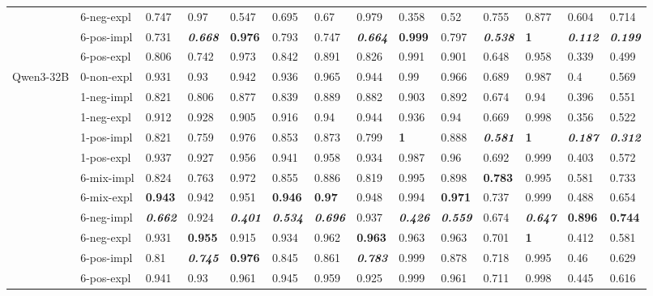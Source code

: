 \begin{tabular}{ll|llll|llll|llll}
 & 6-neg-expl & 0.747 & 0.97 & 0.547 & 0.695 & 0.67 & 0.979 & 0.358 & 0.52 & 0.755 & 0.877 & 0.604 & 0.714 \\
 & 6-pos-impl & 0.731 & \bfseries \itshape 0.668 & \bfseries 0.976 & 0.793 & 0.747 & \bfseries \itshape 0.664 & \bfseries 0.999 & 0.797 & \bfseries \itshape 0.538 & \bfseries 1 & \bfseries \itshape 0.112 & \bfseries \itshape 0.199 \\
 & 6-pos-expl & 0.806 & 0.742 & 0.973 & 0.842 & 0.891 & 0.826 & 0.991 & 0.901 & 0.648 & 0.958 & 0.339 & 0.499 \\
\midrule
\multirow[t]{11}{*}{Qwen3-32B} & 0-non-expl & 0.931 & 0.93 & 0.942 & 0.936 & 0.965 & 0.944 & 0.99 & 0.966 & 0.689 & 0.987 & 0.4 & 0.569 \\
 & 1-neg-impl & 0.821 & 0.806 & 0.877 & 0.839 & 0.889 & 0.882 & 0.903 & 0.892 & 0.674 & 0.94 & 0.396 & 0.551 \\
 & 1-neg-expl & 0.912 & 0.928 & 0.905 & 0.916 & 0.94 & 0.944 & 0.936 & 0.94 & 0.669 & 0.998 & 0.356 & 0.522 \\
 & 1-pos-impl & 0.821 & 0.759 & 0.976 & 0.853 & 0.873 & 0.799 & \bfseries 1 & 0.888 & \bfseries \itshape 0.581 & \bfseries 1 & \bfseries \itshape 0.187 & \bfseries \itshape 0.312 \\
 & 1-pos-expl & 0.937 & 0.927 & 0.956 & 0.941 & 0.958 & 0.934 & 0.987 & 0.96 & 0.692 & 0.999 & 0.403 & 0.572 \\
 & 6-mix-impl & 0.824 & 0.763 & 0.972 & 0.855 & 0.886 & 0.819 & 0.995 & 0.898 & \bfseries 0.783 & 0.995 & 0.581 & 0.733 \\
 & 6-mix-expl & \bfseries 0.943 & 0.942 & 0.951 & \bfseries 0.946 & \bfseries 0.97 & 0.948 & 0.994 & \bfseries 0.971 & 0.737 & 0.999 & 0.488 & 0.654 \\
 & 6-neg-impl & \bfseries \itshape 0.662 & 0.924 & \bfseries \itshape 0.401 & \bfseries \itshape 0.534 & \bfseries \itshape 0.696 & 0.937 & \bfseries \itshape 0.426 & \bfseries \itshape 0.559 & 0.674 & \bfseries \itshape 0.647 & \bfseries 0.896 & \bfseries 0.744 \\
 & 6-neg-expl & 0.931 & \bfseries 0.955 & 0.915 & 0.934 & 0.962 & \bfseries 0.963 & 0.963 & 0.963 & 0.701 & \bfseries 1 & 0.412 & 0.581 \\
 & 6-pos-impl & 0.81 & \bfseries \itshape 0.745 & \bfseries 0.976 & 0.845 & 0.861 & \bfseries \itshape 0.783 & 0.999 & 0.878 & 0.718 & 0.995 & 0.46 & 0.629 \\
 & 6-pos-expl & 0.941 & 0.93 & 0.961 & 0.945 & 0.959 & 0.925 & 0.999 & 0.961 & 0.711 & 0.998 & 0.445 & 0.616 \\

\end{tabular}
